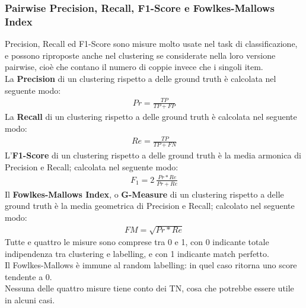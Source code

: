 \subsubsection{Pairwise Precision, Recall, F1-Score e Fowlkes-Mallows Index}
Precision, Recall ed F1-Score sono misure molto usate nel task di classificazione, e possono riproposte anche nel clustering se considerate nella loro versione pairwise, cioè che contano il numero di coppie invece che i singoli item.\\
La \textbf{Precision} di un clustering rispetto a delle ground truth è calcolata nel seguente modo:
\begin{align}
	Pr = \frac{TP}{TP + FP}
\end{align}
La \textbf{Recall} di un clustering rispetto a delle ground truth è calcolata nel seguente modo:
\begin{align}
	Re = \frac{TP}{TP + FN}
\end{align}
L'\textbf{F1-Score} di un clustering rispetto a delle ground truth è la media armonica di Precision e Recall; calcolata nel seguente modo:
\begin{align}
	F_1 = 2\:\frac{Pr * Re}{Pr + Re}
\end{align}
Il \textbf{Fowlkes-Mallows Index}, o \textbf{G-Measure} di un clustering rispetto a delle ground truth è la media geometrica di Precision e Recall; calcolato nel seguente modo:
\begin{align}
	FM = \sqrt{Pr * Re}
\end{align}
Tutte e quattro le misure sono comprese tra 0 e 1, con 0 indicante totale indipendenza tra clustering e labelling, e con 1 indicante match perfetto.\\
Il Fowlkes-Mallows è immune al random labelling: in quel caso ritorna uno score tendente a 0.\\
Nessuna delle quattro misure tiene conto dei TN, cosa che potrebbe essere utile in alcuni casi.

